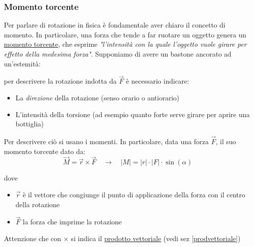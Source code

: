 \subsubsection{Momento torcente}
Per parlare di rotazione in fisica è fondamentale aver chiaro il concetto di momento. In particolare, una forza che tende a far ruotare un oggetto genera un \underline{momento torcente}, che esprime \textit{"l'intensità con la quale l'oggetto vuole girare per effetto della medesima forza"}. Supponiamo di avere un bastone ancorato ad un'estemità:
\begin{center}
\end{center}
per descrivere la rotazione indotta da $ \vec{F} $ è necessario indicare:
\begin{itemize}
	\item La \textit{direzione} della rotazione (senso orario o antiorario)
	\item L'intensità della torsione (ad esempio quanto forte serve girare per aprire una bottiglia)
\end{itemize}

Per descrivere ciò si usano i momenti. In particolare, data una forza $ \vec{F} $, il suo momento torcente dato da:
\[
	\vec{M} = \vec{r} \times \vec{F} \quad  \rightarrow \quad \left|M\right| = \left|r\right| \cdot \left|F\right| \cdot \sin \left(\alpha \right)
\]

dove
\begin{itemize}
	\item $ \vec{r} $ è il vettore che congiunge il punto di applicazione della forza con il centro della rotazione
	\item $ \vec{F} $ la forza che imprime la rotazione
\end{itemize}

Attenzione che con $ \times  $ si indica il \underline{prodotto vettoriale} (vedi sez \ref{prodvettoriale})


